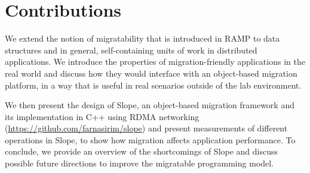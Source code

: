 \section{Contributions}
We extend the notion of migratability that is
introduced in RAMP \cite{memon2018ramp} to data structures and in general,
self-containing units of work in distributed applications.
We introduce
the properties of migration-friendly applications in the real world and discuss
how they would interface with an object-based migration platform, in a way
that is useful in real scenarios outside of the lab environment.

We then present the design of Slope, an object-based migration framework
and its implementation in C++ using RDMA networking (\hyperlink{https://github.com/farnasirim/slope}{https://github.com/farnasirim/slope}) and present measurements
of different operations in Slope, to show how migration affects application
performance.
To conclude, we provide an overview of the shortcomings of Slope and
discuss possible future directions to improve the migratable programming model.

